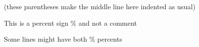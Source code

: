 \documentclass{article}
\begin{document}
(these parentheses
  make the middle line here
indented as usual)



This is a percent sign \% and not a comment

Some lines might have both \% percents %
\end{document}

